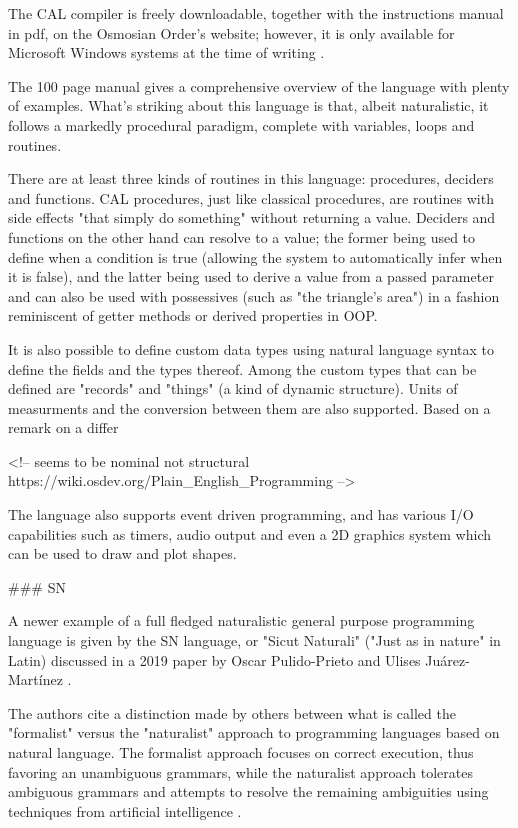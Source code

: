 The CAL compiler is freely downloadable, together with the instructions manual in pdf, on the Osmosian Order's website; however, it is only available for Microsoft Windows systems at the time of writing \cite{osmosianblog}.

The 100 page manual gives a comprehensive overview of the language with plenty of examples. What's striking about this language is that, albeit naturalistic, it follows a markedly procedural paradigm, complete with variables, loops and routines.

There are at least three kinds of routines in this language: procedures, deciders and functions. CAL procedures, just like classical procedures, are routines with side effects "that simply do something" without returning a value. Deciders and functions on the other hand can resolve to a value; the former being used to define when a condition is true (allowing the system to automatically infer when it is false), and the latter being used to derive a value from a passed parameter and can also be used with possessives (such as "the triangle's area") in a fashion reminiscent of getter methods or derived properties in OOP.

It is also possible to define custom data types using natural language syntax to define the fields and the types thereof. Among the custom types that can be defined are "records" and "things" (a kind of dynamic structure). Units of measurments and the conversion between them are also supported. Based on a remark on a differ

<!-- 
seems to be nominal not structural
https://wiki.osdev.org/Plain_English_Programming
 -->

The language also supports event driven programming, and has various I/O capabilities such as timers, audio output and even a 2D graphics system which can be used to draw and plot shapes.

### SN


A newer example of a full fledged naturalistic general purpose programming language is given by the SN language, or "Sicut Naturali" \cite{hernandez2021evolution} ("Just as in nature" in Latin) discussed in a 2019 paper by Oscar Pulido-Prieto and Ulises Juárez-Martínez \cite{pulido2019model}.

The authors cite a distinction made by others between what is called the "formalist" versus the "naturalist" approach to programming languages based on natural language. The formalist approach focuses on correct execution, thus favoring an unambiguous grammars, while the naturalist approach tolerates ambiguous grammars and attempts to resolve the remaining ambiguities using techniques from artificial intelligence \cite{pulido2019model}.

